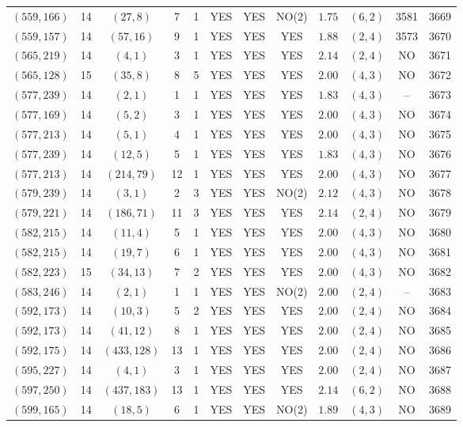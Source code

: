 \begin{longtable}{|c|c|c|c|c|c|c|c|c|c|c|c|}
$(559,166)$ & 14 & $(27,8)$ & 7 & 1 & YES & YES & NO(2) & $1.75$ & $(6,2)$ & 3581 & 3669\\
$(559,157)$ & 14 & $(57,16)$ & 9 & 1 & YES & YES & YES & $1.88$ & $(2,4)$ & 3573 & 3670\\
$(565,219)$ & 14 & $(4,1)$ & 3 & 1 & YES & YES & YES & $2.14$ & $(2,4)$ & NO & 3671\\
$(565,128)$ & 15 & $(35,8)$ & 8 & 5 & YES & YES & YES & $2.00$ & $(4,3)$ & NO & 3672\\
$(577,239)$ & 14 & $(2,1)$ & 1 & 1 & YES & YES & YES & $1.83$ & $(4,3)$ & -- & 3673\\
$(577,169)$ & 14 & $(5,2)$ & 3 & 1 & YES & YES & YES & $2.00$ & $(4,3)$ & NO & 3674\\
$(577,213)$ & 14 & $(5,1)$ & 4 & 1 & YES & YES & YES & $2.00$ & $(4,3)$ & NO & 3675\\
$(577,239)$ & 14 & $(12,5)$ & 5 & 1 & YES & YES & YES & $1.83$ & $(4,3)$ & NO & 3676\\
$(577,213)$ & 14 & $(214,79)$ & 12 & 1 & YES & YES & YES & $2.00$ & $(4,3)$ & NO & 3677\\
$(579,239)$ & 14 & $(3,1)$ & 2 & 3 & YES & YES & NO(2) & $2.12$ & $(4,3)$ & NO & 3678\\
$(579,221)$ & 14 & $(186,71)$ & 11 & 3 & YES & YES & YES & $2.14$ & $(2,4)$ & NO & 3679\\
$(582,215)$ & 14 & $(11,4)$ & 5 & 1 & YES & YES & YES & $2.00$ & $(4,3)$ & NO & 3680\\
$(582,215)$ & 14 & $(19,7)$ & 6 & 1 & YES & YES & YES & $2.00$ & $(4,3)$ & NO & 3681\\
$(582,223)$ & 15 & $(34,13)$ & 7 & 2 & YES & YES & YES & $2.00$ & $(4,3)$ & NO & 3682\\
$(583,246)$ & 14 & $(2,1)$ & 1 & 1 & YES & YES & NO(2) & $2.00$ & $(2,4)$ & -- & 3683\\
$(592,173)$ & 14 & $(10,3)$ & 5 & 2 & YES & YES & YES & $2.00$ & $(2,4)$ & NO & 3684\\
$(592,173)$ & 14 & $(41,12)$ & 8 & 1 & YES & YES & YES & $2.00$ & $(2,4)$ & NO & 3685\\
$(592,175)$ & 14 & $(433,128)$ & 13 & 1 & YES & YES & YES & $2.00$ & $(2,4)$ & NO & 3686\\
$(595,227)$ & 14 & $(4,1)$ & 3 & 1 & YES & YES & YES & $2.00$ & $(2,4)$ & NO & 3687\\
$(597,250)$ & 14 & $(437,183)$ & 13 & 1 & YES & YES & YES & $2.14$ & $(6,2)$ & NO & 3688\\
$(599,165)$ & 14 & $(18,5)$ & 6 & 1 & YES & YES & NO(2) & $1.89$ & $(4,3)$ & NO & 3689\\

\end{longtable}
